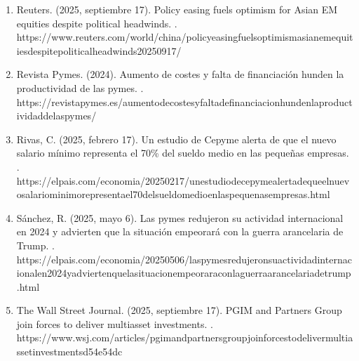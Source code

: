 \documentclass[letterpaper,10pt,spanish]{sphinxmanual}
\begin{document}
\begin{enumerate}
\item {} 
\sphinxAtStartPar
Reuters. (2025, septiembre 17). Policy easing fuels optimism for Asian EM equities despite political headwinds. . https://www.reuters.com/world/china/policy\sphinxhyphen{}easing\sphinxhyphen{}fuels\sphinxhyphen{}optimism\sphinxhyphen{}asian\sphinxhyphen{}em\sphinxhyphen{}equities\sphinxhyphen{}despite\sphinxhyphen{}political\sphinxhyphen{}headwinds\sphinxhyphen{}2025\sphinxhyphen{}09\sphinxhyphen{}17/

\item {} 
\sphinxAtStartPar
Revista Pymes. (2024). Aumento de costes y falta de financiación hunden la productividad de las pymes. . https://revistapymes.es/aumento\sphinxhyphen{}de\sphinxhyphen{}costes\sphinxhyphen{}y\sphinxhyphen{}falta\sphinxhyphen{}de\sphinxhyphen{}financiacion\sphinxhyphen{}hunden\sphinxhyphen{}la\sphinxhyphen{}productividad\sphinxhyphen{}de\sphinxhyphen{}las\sphinxhyphen{}pymes/

\item {} 
\sphinxAtStartPar
Rivas, C. (2025, febrero 17). Un estudio de Cepyme alerta de que el nuevo salario mínimo representa el 70\% del sueldo medio en las pequeñas empresas. . https://elpais.com/economia/2025\sphinxhyphen{}02\sphinxhyphen{}17/un\sphinxhyphen{}estudio\sphinxhyphen{}de\sphinxhyphen{}cepyme\sphinxhyphen{}alerta\sphinxhyphen{}de\sphinxhyphen{}que\sphinxhyphen{}el\sphinxhyphen{}nuevo\sphinxhyphen{}salario\sphinxhyphen{}minimo\sphinxhyphen{}representa\sphinxhyphen{}el\sphinxhyphen{}70\sphinxhyphen{}del\sphinxhyphen{}sueldo\sphinxhyphen{}medio\sphinxhyphen{}en\sphinxhyphen{}las\sphinxhyphen{}pequenas\sphinxhyphen{}empresas.html

\item {} 
\sphinxAtStartPar
Sánchez, R. (2025, mayo 6). Las pymes redujeron su actividad internacional en 2024 y advierten que la situación empeorará con la guerra arancelaria de Trump. . https://elpais.com/economia/2025\sphinxhyphen{}05\sphinxhyphen{}06/las\sphinxhyphen{}pymes\sphinxhyphen{}redujeron\sphinxhyphen{}su\sphinxhyphen{}actividad\sphinxhyphen{}internacional\sphinxhyphen{}en\sphinxhyphen{}2024\sphinxhyphen{}y\sphinxhyphen{}advierten\sphinxhyphen{}que\sphinxhyphen{}la\sphinxhyphen{}situacion\sphinxhyphen{}empeorara\sphinxhyphen{}con\sphinxhyphen{}la\sphinxhyphen{}guerra\sphinxhyphen{}arancelaria\sphinxhyphen{}de\sphinxhyphen{}trump.html

\item {} 
\sphinxAtStartPar
The Wall Street Journal. (2025, septiembre 17). PGIM and Partners Group join forces to deliver multi\sphinxhyphen{}asset investments. . https://www.wsj.com/articles/pgim\sphinxhyphen{}and\sphinxhyphen{}partners\sphinxhyphen{}group\sphinxhyphen{}join\sphinxhyphen{}forces\sphinxhyphen{}to\sphinxhyphen{}deliver\sphinxhyphen{}multi\sphinxhyphen{}asset\sphinxhyphen{}investments\sphinxhyphen{}d54e54dc


\end{enumerate}
\end{document}
